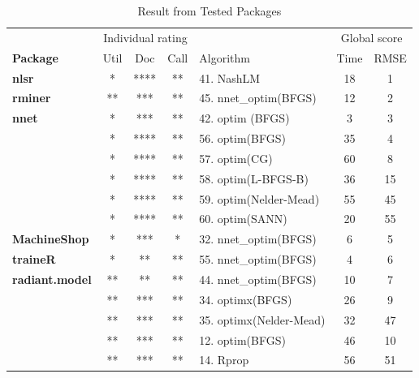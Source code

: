 \begin{Schunk}
\begin{table}

\caption{\label{tab:unnamed-chunk-2}Result from Tested Packages}
\centering
\fontsize{7}{9}\selectfont
\begin{tabular}[t]{>{\bfseries}lccclcc}
\toprule
\multicolumn{1}{c}{ } & \multicolumn{3}{c}{Individual rating} & \multicolumn{1}{c}{ } & \multicolumn{2}{c}{Global score} \\
\cmidrule(l{3pt}r{3pt}){2-4} \cmidrule(l{3pt}r{3pt}){6-7}
Package & Util & Doc & Call & Algorithm & Time & RMSE\\
\midrule
nlsr & * & **** & ** & 41. NashLM & 18 & 1\\
\cmidrule{1-7}
rminer & ** & *** & ** & 45. nnet\_optim(BFGS) & 12 & 2\\
\cmidrule{1-7}
nnet & * & *** & ** & 42. optim (BFGS) & 3 & 3\\
\cmidrule{1-7}
 & * & **** & ** & 56. optim(BFGS) & 35 & 4\\

 & * & **** & ** & 57. optim(CG) & 60 & 8\\

 & * & **** & ** & 58. optim(L-BFGS-B) & 36 & 15\\

 & * & **** & ** & 59. optim(Nelder-Mead) & 55 & 45\\

\multirow{-5}{*}{\raggedright\arraybackslash validann} & * & **** & ** & 60. optim(SANN) & 20 & 55\\
\cmidrule{1-7}
MachineShop & * & *** & * & 32. nnet\_optim(BFGS) & 6 & 5\\
\cmidrule{1-7}
traineR & * & ** & ** & 55. nnet\_optim(BFGS) & 4 & 6\\
\cmidrule{1-7}
radiant.model & ** & ** & ** & 44. nnet\_optim(BFGS) & 10 & 7\\
\cmidrule{1-7}
 & ** & *** & ** & 34. optimx(BFGS) & 26 & 9\\

\multirow{-2}{*}{\raggedright\arraybackslash monmlp} & ** & *** & ** & 35. optimx(Nelder-Mead) & 32 & 47\\
\cmidrule{1-7}
 & ** & *** & ** & 12. optim(BFGS) & 46 & 10\\

 & ** & *** & ** & 14. Rprop & 56 & 51\\


\end{tabular}
\end{table}
\end{Schunk}
